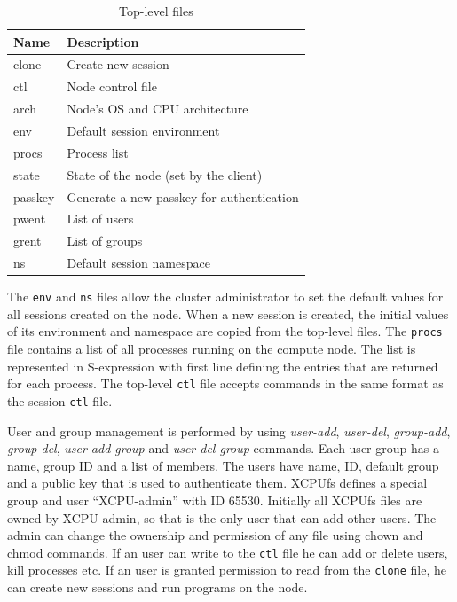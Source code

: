 \documentclass[10pt,conference,letterpaper]{IEEEtran}
\begin{document}
\begin{table}[ht]
\begin{center}
\begin{tabular}{lp{2.4in}}
    Name & Description\\
    \hline
    \ttfamily clone & Create new session\\
    \ttfamily ctl & Node control file\\
    \ttfamily arch & Node's OS and CPU architecture\\
    \ttfamily env & Default session environment\\
    \ttfamily procs & Process list\\
    \ttfamily state & State of the node (set by the client)\\
    \ttfamily passkey & Generate a new passkey for authentication\\
    \ttfamily pwent & List of users\\
    \ttfamily grent & List of groups\\
    \ttfamily ns & Default session namespace\\
\end{tabular}
\caption{Top-level files}
\label{tbl:XCPU2-top}
\end{center}
\end{table}

The \texttt{env} and \texttt{ns} files allow the cluster administrator to
set the default values for all sessions created on the node. When a new
session is created, the initial values of its environment and namespace are
copied from the top-level files. The \texttt{procs} file contains a list of
all processes running on the compute node. The list is represented in
S-expression with first line defining the entries that are returned for each
process. The top-level \texttt{ctl} file accepts commands in the same format
as the session \texttt{ctl} file.

User and group management is performed by using \textsl{user-add},
\textsl{user-del}, \textsl{group-add}, \textsl{group-del},
\textsl{user-add-group} and \textsl{user-del-group} commands. Each user
group has a name, group ID and a list of members. The users have name, ID,
default group and a public key that is used to authenticate them. XCPUfs
defines a special group and user ``XCPU-admin'' with ID 65530. Initially all
XCPUfs files are owned by XCPU-admin, so that is the only user that can add
other users. The admin can change the ownership and permission of any file 
using chown and chmod commands. If an user can write to the \texttt{ctl}
file he can add or delete users, kill processes etc. If an user is granted
permission to read from the \texttt{clone} file, he can create new sessions
and run programs on the node.
\end{document}
